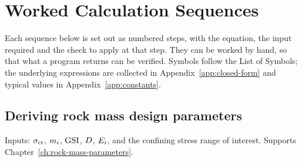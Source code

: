 \chapter{Worked Calculation Sequences}
\label{app:calculations}

Each sequence below is set out as numbered steps, with the equation, the input
required and the check to apply at that step. They can be worked by
hand, so that what a program returns can be verified.
Symbols follow the List of Symbols; the underlying expressions are collected
in Appendix~\ref{app:closed-form} and typical values in
Appendix~\ref{app:constants}.

\section{Deriving rock mass design parameters}
\label{sec:seq-parameters}

Inputs: $\sigma_{ci}$, $m_i$, $\mathrm{GSI}$, $D$, $E_i$, and the confining stress range
of interest. Supports Chapter~\ref{ch:rock-mass-parameters}.

